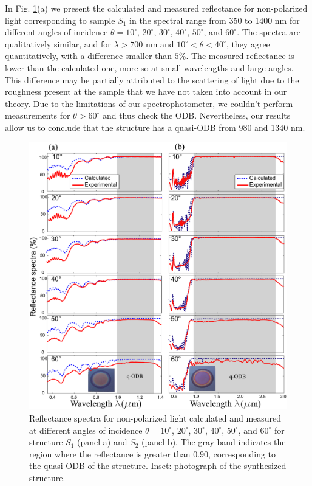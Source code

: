 \documentclass[a4paper,fleqn]{cas-sc}
\begin{document}
In Fig. \ref{Fig2}(a) we present the calculated and measured
reflectance for non-polarized light corresponding to sample $S_1$ in the spectral range from 350 to 1400
nm for different angles of
incidence $\theta=10^\circ$, $20^\circ$, $30^\circ$, $40^\circ$,
$50^\circ$, and $60^\circ$. The spectra are qualitatively
similar, and for $\lambda>700$ nm and $10^\circ < \theta <
40^\circ$, they agree quantitatively, with a difference smaller
than $5\%$.
The
measured reflectance is lower than the calculated one, more so at
small wavelengths and large angles. This difference
may be partially attributed to the scattering of light due to the
roughness present at the sample
\cite{Theiss1994,Chavez2020,Ortiz2020} that we have not taken into
account in our theory. Due to the limitations of our
spectrophotometer, we couldn't perform measurements for $\theta>60^\circ$ and thus
check the ODB. Nevertheless, our results allow us to conclude that
the structure has a quasi-ODB from 980 and
1340 nm.
\begin{figure}
  \begin{center}
    \includegraphics[width=\textwidth]{F2Alternativa.pdf}
  \end{center}
  \caption{Reflectance spectra for non-polarized light calculated and measured at different
    angles of incidence $\theta=10^\circ$, $20^\circ$, $30^\circ$,
    $40^\circ$, $50^\circ$, and $60^\circ$ for structure $S_1$
    (panel a)  and $S_2$ (panel b). The gray band indicates the
    region where the reflectance is greater than  $0.90$,
    corresponding to the quasi-ODB of the
    structure. Inset: photograph of the synthesized structure.}
  \label{Fig2}
\end{figure}
\end{document}
